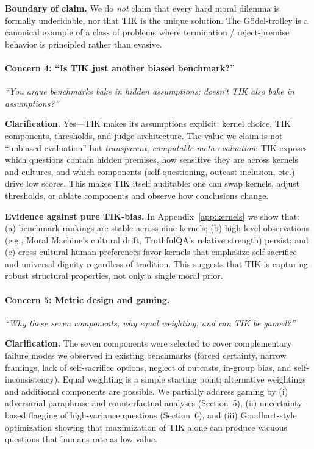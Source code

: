\documentclass[11pt]{article}
\begin{document}
\textbf{Boundary of claim.} We do \emph{not} claim that every hard moral dilemma is formally undecidable, nor that TIK is the unique solution. The Gödel-trolley is a canonical example of a class of problems where termination / reject-premise behavior is principled rather than evasive.

\paragraph{Concern 4: “Is TIK just another biased benchmark?”}
\emph{“You argue benchmarks bake in hidden assumptions; doesn't TIK also bake in assumptions?”}

\textbf{Clarification.} Yes---TIK makes its assumptions explicit: kernel choice, TIK components, thresholds, and judge architecture. The value we claim is not “unbiased evaluation” but \emph{transparent, computable meta-evaluation}: TIK exposes which questions contain hidden premises, how sensitive they are across kernels and cultures, and which components (self-questioning, outcast inclusion, etc.) drive low scores. This makes TIK itself auditable: one can swap kernels, adjust thresholds, or ablate components and observe how conclusions change.

\textbf{Evidence against pure TIK-bias.} In Appendix~\ref{app:kernels} we show that: (a) benchmark rankings are stable across nine kernels; (b) high-level observations (e.g., Moral Machine's cultural drift, TruthfulQA's relative strength) persist; and (c) cross-cultural human preferences favor kernels that emphasize self-sacrifice and universal dignity regardless of tradition. This suggests that TIK is capturing robust structural properties, not only a single moral prior.

\paragraph{Concern 5: Metric design and gaming.}
\emph{“Why these seven components, why equal weighting, and can TIK be gamed?”}

\textbf{Clarification.} The seven components were selected to cover complementary failure modes we observed in existing benchmarks (forced certainty, narrow framings, lack of self-sacrifice options, neglect of outcasts, in-group bias, and self-inconsistency). Equal weighting is a simple starting point; alternative weightings and additional components are possible. We partially address gaming by (i) adversarial paraphrase and counterfactual analyses (Section~5), (ii) uncertainty-based flagging of high-variance questions (Section~6), and (iii) Goodhart-style optimization showing that maximization of TIK alone can produce vacuous questions that humans rate as low-value.
\end{document}
